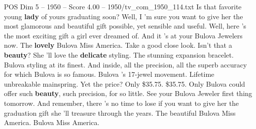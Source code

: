 \begin{textsample}{POS Dim 5 – 1950 – Score 4.00 – 1950/tv\_com\_1950\_114.txt}  \label{ex:f5_pos_049}
Is that favorite young \textbf{lady} of yours graduating soon?
Well, I 'm sure you want to give her the most glamorous and beautiful gift possible, yet sensible and useful.
Well, here 's the most exciting gift a girl ever dreamed of.
And it 's at your Bulova Jewelers now.
The \textbf{lovely} Bulova Miss America.
Take a good close look.
Isn't that a \textbf{beauty}?
She 'll love the \textbf{delicate} styling.
The stunning expansion bracelet.
Bulova styling at its finest.
And inside, all the precision, all the superb accuracy for which Bulova is so famous.
Bulova 's 17-jewel movement.
Lifetime unbreakable mainspring.
Yet the price?
Only \$35.75. \$35.75.
Only Bulova could offer such \textbf{beauty}, such precision, for so little.
See your Bulova Jeweler first thing tomorrow.
And remember, there 's no time to lose if you want to give her the graduation gift she 'll treasure through the years.
The beautiful Bulova Miss America.
Bulova Miss America.

\end{textsample}
